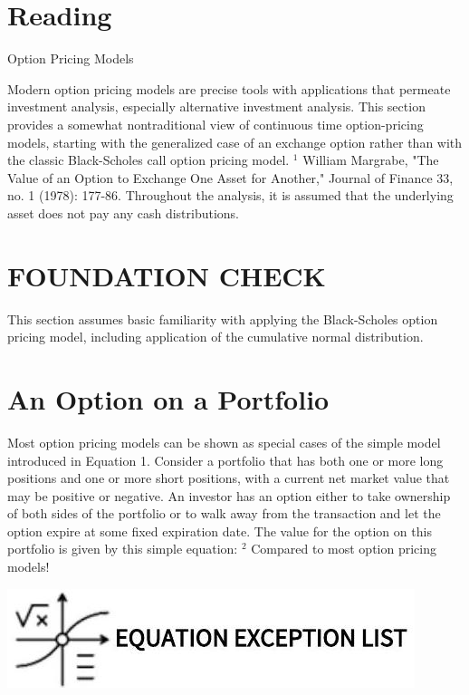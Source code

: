 \documentclass[11pt]{article}
\begin{document}
\section*{Reading}
Option Pricing Models

Modern option pricing models are precise tools with applications that permeate investment analysis, especially alternative investment analysis. This section provides a somewhat nontraditional view of continuous time option-pricing models, starting with the generalized case of an exchange option rather than with the classic Black-Scholes call option pricing model. ${ }^{1}$ William Margrabe, "The Value of an Option to Exchange One Asset for Another," Journal of Finance 33, no. 1 (1978): 177-86. Throughout the analysis, it is assumed that the underlying asset does not pay any cash distributions.

\section*{FOUNDATION CHECK}
This section assumes basic familiarity with applying the Black-Scholes option pricing model, including application of the cumulative normal distribution.

\section*{An Option on a Portfolio}
Most option pricing models can be shown as special cases of the simple model introduced in Equation 1. Consider a portfolio that has both one or more long positions and one or more short positions, with a current net market value that may be positive or negative. An investor has an option either to take ownership of both sides of the portfolio or to walk away from the transaction and let the option expire at some fixed expiration date. The value for the option on this portfolio is given by this simple equation: ${ }^{2}$ Compared to most option pricing models!

\begin{center}
\includegraphics[max width=\textwidth]{2024_04_11_7c728ae44168a8fb26cag-2(1)}
\end{center}
\end{document}
